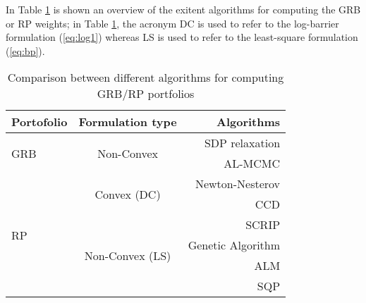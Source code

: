 In Table \ref{tab:t} is shown an overview of the exitent algorithms for computing the GRB or RP weights; in Table \ref{tab:t}, the acronym DC is used to refer to the log-barrier formulation (\ref{eq:log1}) whereas LS is used to refer to the least-square formulation (\ref{eq:bp}).
\begin{table}
\begin{center}
\begin{tabular}{| l | c| r |}
\hline
    \textbf{Portofolio} &\textbf{Formulation type}& \textbf{Algorithms}  \\ \hline
    \multirow{2}{4em}{GRB}& \multirow{2}{6em}{Non-Convex}  &SDP relaxation \cite{sdp}  \\ \cline{3-3}
     &  &AL-MCMC \cite{sdp}\\ \hline
    \multirow{7}{4em}{RP}& \multirow{2}{6em}{Convex (DC)}  &Newton-Nesterov \cite{spinu}\\\cline{3-3}     
    &  & CCD \cite{ccd}\\ \cline{2-3}
     &\multirow{4}{8em}{Non-Convex (LS)} & SCRIP \cite{scrip}\\ \cline{3-3}
    && Genetic Algorithm \cite{genetic} \\\cline{3-3}
    && ALM \cite{tutuncu}\\ \cline{3-3}
    && SQP \cite{erc}\\ 
    \hline
\end{tabular}
\end{center}
\caption{Comparison between different algorithms for computing GRB/RP portfolios}
\label{tab:t}
\end{table}
